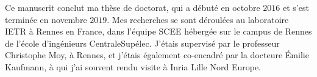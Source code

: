 \begin{resume_fr}



Ce manuscrit conclut ma thèse de doctorat, qui a débuté en octobre $2016$ et s'est terminée en novembre $2019$.
Mes recherches se sont déroulées au laboratoire IETR à Rennes en France, dans l'équipe SCEE hébergée sur le campus de Rennes de l'école d'ingénieurs CentraleSupélec.
J'étais supervisé par le professeur Christophe Moy, à Rennes,
et j'étais également co-encadré par la docteure Émilie Kaufmann, à qui j'ai souvent rendu visite à Inria Lille Nord Europe.





\end{resume_fr}
